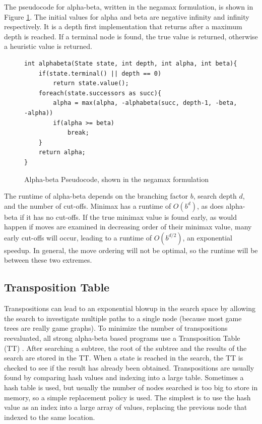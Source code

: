The pseudocode for alpha-beta, written in the negamax formulation, is shown in Figure \ref{fig:abcode}. The initial values for alpha and beta are negative infinity and infinity respectively. It is a depth first implementation that returns after a maximum depth is reached. If a terminal node is found, the true value is returned, otherwise a heuristic value is returned.

\begin{figure}

\begin{lstlisting}
int alphabeta(State state, int depth, int alpha, int beta){
	if(state.terminal() || depth == 0)
		return state.value();
	foreach(state.successors as succ){
		alpha = max(alpha, -alphabeta(succ, depth-1, -beta, -alpha))
		if(alpha >= beta)
			break;
	}
	return alpha;
}
\end{lstlisting}

\caption{Alpha-beta Pseudocode, shown in the negamax formulation}
\label{fig:abcode}
\end{figure}

The runtime of alpha-beta depends on the branching factor $b$, search depth $d$, and the number of cut-offs. Minimax has a runtime of $O(b^d)$, as does alpha-beta if it has no cut-offs. If the true minimax value is found early, as would happen if moves are examined in decreasing order of their minimax value, many early cut-offs will occur, leading to a runtime of $O(b^{d/2})$, an exponential speedup. In general, the move ordering will not be optimal, so the runtime will be between these two extremes.

\subsection{Transposition Table}

Transpositions can lead to an exponential blowup in the search space by allowing the search to investigate multiple paths to a single node (because most game trees are really game graphs). To minimize the number of transpositions reevaluated, all strong alpha-beta based programs use a Transposition Table (TT) \cite{slate1977chess}. After searching a subtree, the root of the subtree and the results of the search are stored in the TT. When a state is reached in the search, the TT is checked to see if the result has already been obtained. Transpositions are usually found by comparing hash values and indexing into a large table. Sometimes a hash table is used, but usually the number of nodes searched is too big to store in memory, so a simple replacement policy is used. The simplest is to use the hash value as an index into a large array of values, replacing the previous node that indexed to the same location.

